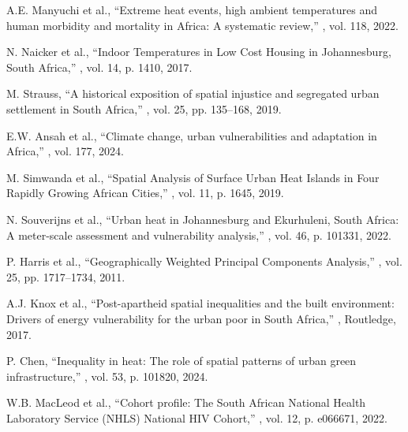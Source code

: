\documentclass[11pt,a4paper]{article}
\begin{document}
\begin{thebibliography}{99}
A.E. Manyuchi et al.,
\newblock ``Extreme heat events, high ambient temperatures and human morbidity and mortality in Africa: A systematic review,''
, vol. 118, 2022.

N. Naicker et al.,
\newblock ``Indoor Temperatures in Low Cost Housing in Johannesburg, South Africa,''
, vol. 14, p. 1410, 2017.

M. Strauss,
\newblock ``A historical exposition of spatial injustice and segregated urban settlement in South Africa,''
, vol. 25, pp. 135--168, 2019.

E.W. Ansah et al.,
\newblock ``Climate change, urban vulnerabilities and adaptation in Africa,''
, vol. 177, 2024.

M. Simwanda et al.,
\newblock ``Spatial Analysis of Surface Urban Heat Islands in Four Rapidly Growing African Cities,''
, vol. 11, p. 1645, 2019.

N. Souverijns et al.,
\newblock ``Urban heat in Johannesburg and Ekurhuleni, South Africa: A meter-scale assessment and vulnerability analysis,''
, vol. 46, p. 101331, 2022.

P. Harris et al.,
\newblock ``Geographically Weighted Principal Components Analysis,''
, vol. 25, pp. 1717--1734, 2011.

A.J. Knox et al.,
\newblock ``Post-apartheid spatial inequalities and the built environment: Drivers of energy vulnerability for the urban poor in South Africa,''
, Routledge, 2017.

P. Chen,
\newblock ``Inequality in heat: The role of spatial patterns of urban green infrastructure,''
, vol. 53, p. 101820, 2024.

W.B. MacLeod et al.,
\newblock ``Cohort profile: The South African National Health Laboratory Service (NHLS) National HIV Cohort,''
, vol. 12, p. e066671, 2022.


\end{thebibliography}
\end{document}
